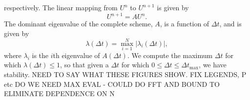respectively.  
The linear mapping from $U^n$ to $U^{n+1}$ is given by
$$
U^{n+1} = AU^n.
$$
The dominant eigenvalue of the complete scheme, $A$, is a function of $\Delta t$, and is given by
$$
\lambda(\Delta t) = \max_{i=1}^{N}|\lambda_i(\Delta t)|,
$$
where $\lambda_i$ is the $i$th eigenvalue of $A(\Delta t)$.
We compute the maximum $\Delta t$ for which $\lambda(\Delta t) \leq 1$, so
that given a $\Delta t$ for which $0\leq \Delta t \leq \Delta t_{\text{max}}$,
we have stability.
NEED TO SAY WHAT THESE FIGURES SHOW. FIX LEGENDS, P etc
DO WE NEED MAX EVAL - COULD DO FFT AND BOUND TO ELIMINATE DEPENDENCE ON N

 





